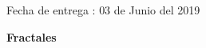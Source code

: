 \documentclass{article}
\begin{document}
\begin{titlepage}
	
	
	
	\vfill\vfill\vfill %
	{\large Fecha de entrega :} 
	{\large  03 de Junio del 2019} %
	
	
	 
	
	\vfill %
	
\end{titlepage}


\begin{Huge}
	\begin{center}
		\textbf{Fractales \\[1cm]}
	\end{center}	 
\end{Huge}
\end{document}
